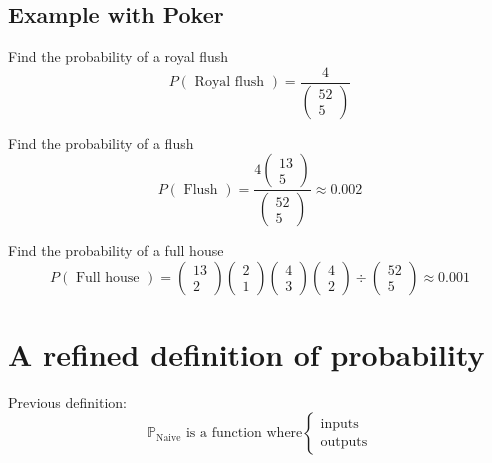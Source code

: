 \subsection{Example with Poker}

Find the probability of a royal flush \\
\[
  P(\text{ Royal flush }) = \frac{4}{ \begin{pmatrix} 52 \\5 \end{pmatrix} } 
\] 

Find the probability of a flush
\[
  P(\text{ Flush }) =  \frac{4 \begin{pmatrix} 13 \\5 \end{pmatrix} }{ \begin{pmatrix} 52 \\5 \end{pmatrix} } \approx 0.002
\] 

Find the probability of a full house
\[
  P(\text{ Full house }) =  \begin{pmatrix} 13 \\2 \end{pmatrix}  \begin{pmatrix} 2 \\ 1 \end{pmatrix}  \begin{pmatrix} 4 \\3 \end{pmatrix}  \begin{pmatrix} 4 \\2 \end{pmatrix} \div \begin{pmatrix} 52 \\5  \end{pmatrix}  \approx 0.001
\] 
\section{A refined definition of probability}

Previous definition: 
\[
   \mathbb{P}_{ \text{Naive}} \text{ is a function where} \left \{ \begin{array}{ll} 
         \text{inputs} \\
         \text{outputs}
   \end{array} \right.
\] 

